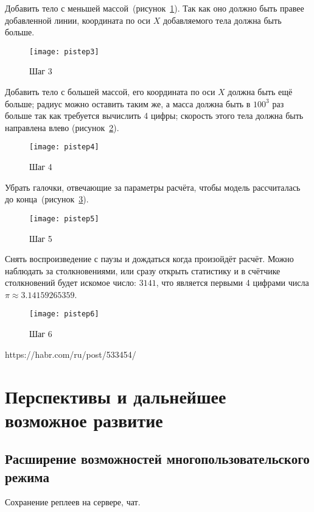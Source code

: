 Добавить тело с меньшей массой~(рисунок~\ref{pistep3fig}).
Так как оно должно быть правее добавленной линии, координата по оси \(X\)
добавляемого тела должна быть больше.

\begin{figure}[H]
    \centering
    \texttt{[image: pistep3]}
    \caption{Шаг 3\label{pistep3fig}}
\end{figure}

Добавить тело с большей массой, его координата по оси \(X\) должна быть ещё больше;
радиус можно оставить таким же, а масса должна быть в \(100^3\) раз больше так как требуется вычислить 4 цифры;
скорость этого тела должна быть направлена влево (рисунок~\ref{pistep4fig}).

\begin{figure}[H]
    \centering
    \texttt{[image: pistep4]}
    \caption{Шаг 4\label{pistep4fig}}
\end{figure}

Убрать галочки, отвечающие за параметры расчёта, чтобы модель рассчиталась до конца~(рисунок~\ref{pistep5fig}).

\begin{figure}[H]
    \centering
    \texttt{[image: pistep5]}
    \caption{Шаг 5\label{pistep5fig}}
\end{figure}

Снять воспроизведение с паузы и дождаться когда произойдёт расчёт. Можно наблюдать за столкновениями,
или сразу открыть статистику и в счётчике столкновений будет искомое число: \(3141\), что является
первыми 4 цифрами числа \(\pi \approx 3.14159265359\).

\begin{figure}[H]
    \centering
    \texttt{[image: pistep6]}
    \caption{Шаг 6\label{pistep6fig}}
\end{figure}

\TODO https://habr.com/ru/post/533454/

\section{Перспективы и дальнейшее возможное развитие}

\subsection{Расширение возможностей многопользовательского режима}

\TODO Сохранение реплеев на сервере, чат.

